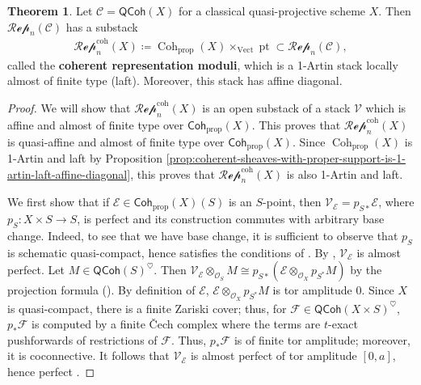 \documentclass{article}
\numberwithin{equation}{section}
\theoremstyle{quest}
\theoremstyle{definition}
\newtheorem{thm}{Theorem}[section]
\theoremstyle{remark}
\DeclareMathOperator{\pt}{pt}
\DeclareMathOperator{\Coh}{Coh}
\DeclareMathOperator{\Vect}{Vect}
\begin{document}
\begin{thm}\label{thm:coherent-reps}
	Let $\mathcal{C}=\mathsf{QCoh}(X)$ for a classical quasi-projective scheme $X$. Then $\mathscr{Rep}_n(\mathcal{C})$ has a substack
	\begin{align*}
		\mathscr{Rep}_n^{\text{coh}}(X)\coloneqq \Coh_{\text{prop}}(X)\times _{\Vect}\pt\subset \mathscr{Rep}_n(\mathcal{C}),
	\end{align*} 
	called the \textbf{coherent representation moduli}, which is a 1-Artin stack locally almost of finite type (laft). Moreover, this stack has affine diagonal.
\end{thm} 
\begin{proof}
	We will show that $\mathscr{Rep}_n^{\text{coh}}(X)$ is an open substack of a stack $\mathscr{V}$ which is affine and almost of finite type over $\mathsf{Coh}_{\text{prop}}(X)$. This proves that $\mathscr{Rep}_n^{\text{coh}}(X)$ is quasi-affine and almost of finite type over $\mathsf{Coh}_{\text{prop}}(X)$. Since $\Coh_{\text{prop}}(X)$ is 1-Artin and laft by Proposition \ref{prop:coherent-sheaves-with-proper-support-is-1-artin-laft-affine-diagonal}, this proves that $\mathscr{Rep}_n^{\text{coh}}(X)$ is also 1-Artin and laft.

	We first show that if $\mathscr{E}\in \mathsf{Coh}_\text{prop}(X)(S)$ is an $S$-point, then $\mathscr{V}_{\mathscr{E}}=p_{S*}\mathscr{E}$, where $p_S:X\times S\to S$, is perfect and its construction commutes with arbitrary base change. Indeed, to see that we have base change, it is sufficient to observe that $p_S$ is schematic quasi-compact, hence satisfies the conditions of \cite[Chapter 3 Section 2.2]{GR}. By \cite[Proposition 2.28]{PS}, $\mathscr{V}_{\mathscr{E}}$ is almost perfect. Let $M\in \mathsf{QCoh}(S)^\heartsuit$. Then $\mathscr{V}_{\mathscr{E}}\otimes_{\mathscr{O}_S}M\cong p_{S*}(\mathscr{E}\otimes _{\mathscr{O}_X}p_{S^*}M)$ by the projection formula (\cite[Chapter 3 Lemma 3.2.4]{GR}). By definition of $\mathscr{E}$, $\mathscr{E}\otimes_{\mathscr{O}_X} p_{S^*}M$ is tor amplitude 0. Since $X$ is quasi-compact, there is a finite Zariski cover; thus, for $\mathscr{F}\in \mathsf{QCoh}(X\times S)^\heartsuit$, $p_*\mathscr{F}$ is computed by a finite \v{C}ech complex where the terms are $t$-exact pushforwards of restrictions of $\mathscr{F}$. Thus, $p_*\mathscr{F}$ is of finite tor amplitude; moreover, it is coconnective. It follows that $\mathscr{V}_{\mathscr{E}}$ is almost perfect of tor amplitude $[0,a]$, hence perfect \cite[Proposition 7.2.4.23]{HA}.


\end{proof}
\end{document}
